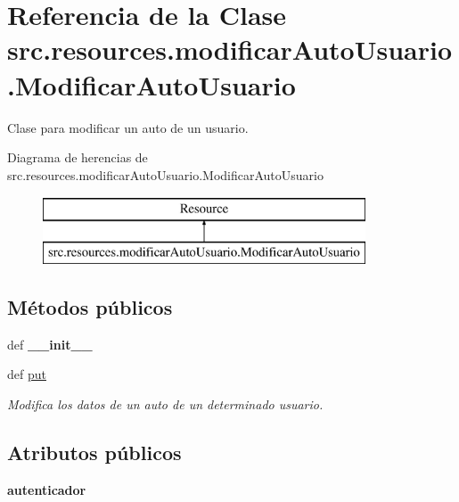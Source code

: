 \hypertarget{classsrc_1_1resources_1_1modificar_auto_usuario_1_1_modificar_auto_usuario}{\section{Referencia de la Clase src.\-resources.\-modificar\-Auto\-Usuario.\-Modificar\-Auto\-Usuario}
\label{classsrc_1_1resources_1_1modificar_auto_usuario_1_1_modificar_auto_usuario}
}


Clase para modificar un auto de un usuario.  


Diagrama de herencias de src.\-resources.\-modificar\-Auto\-Usuario.\-Modificar\-Auto\-Usuario\begin{figure}[H]
\begin{center}
\leavevmode
\includegraphics[height=2.000000cm]{classsrc_1_1resources_1_1modificar_auto_usuario_1_1_modificar_auto_usuario}
\end{center}
\end{figure}
\subsection*{Métodos públicos}
\begin{DoxyCompactItemize}
\item 
\hypertarget{classsrc_1_1resources_1_1modificar_auto_usuario_1_1_modificar_auto_usuario_a61c9a0026e46c161bf9b09dff39eb675}{def {\bfseries \-\_\-\-\_\-init\-\_\-\-\_\-}}\label{classsrc_1_1resources_1_1modificar_auto_usuario_1_1_modificar_auto_usuario_a61c9a0026e46c161bf9b09dff39eb675}

\item 
def \hyperlink{classsrc_1_1resources_1_1modificar_auto_usuario_1_1_modificar_auto_usuario_a600fa25d061c4fd53659bb3afea11c4a}{put}
\begin{DoxyCompactList}\small\item\em Modifica los datos de un auto de un determinado usuario. \end{DoxyCompactList}\end{DoxyCompactItemize}
\subsection*{Atributos públicos}
\begin{DoxyCompactItemize}
\item 
\hypertarget{classsrc_1_1resources_1_1modificar_auto_usuario_1_1_modificar_auto_usuario_a412b33ba625ecce071da19cad1ed3a5c}{{\bfseries autenticador}}\label{classsrc_1_1resources_1_1modificar_auto_usuario_1_1_modificar_auto_usuario_a412b33ba625ecce071da19cad1ed3a5c}

\end{DoxyCompactItemize}

